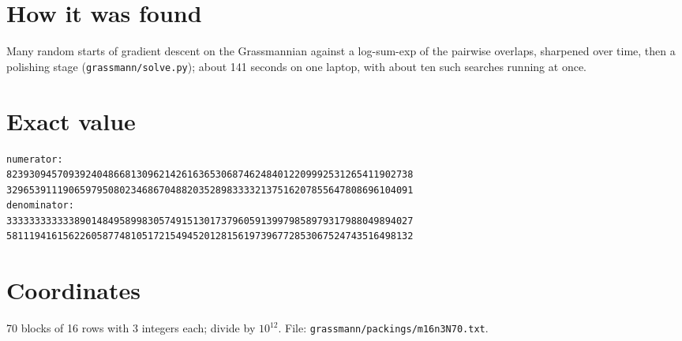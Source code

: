 \documentclass[11pt,a4paper]{article}
\begin{document}
\section{How it was found}
Many random starts of gradient descent on the Grassmannian against a log-sum-exp of the pairwise overlaps, sharpened over time, then a polishing stage (\texttt{grassmann/solve.py}); about 141 seconds on one laptop, with about ten such searches running at once.


\appendix
\section{Exact value}
{\small
\begin{verbatim}
numerator:
823930945709392404866813096214261636530687462484012209992531265411902738
329653911190659795080234686704882035289833332137516207855647808696104091
denominator:
333333333333890148495899830574915130173796059139979858979317988049894027
581119416156226058774810517215494520128156197396772853067524743516498132
\end{verbatim}}

\section{Coordinates}
70 blocks of 16 rows with 3 integers each; divide by $10^{12}$. File: \texttt{grassmann/packings/m16n3N70.txt}.
{\tiny
\begin{multicols}{3}
\end{multicols}}
\end{document}
